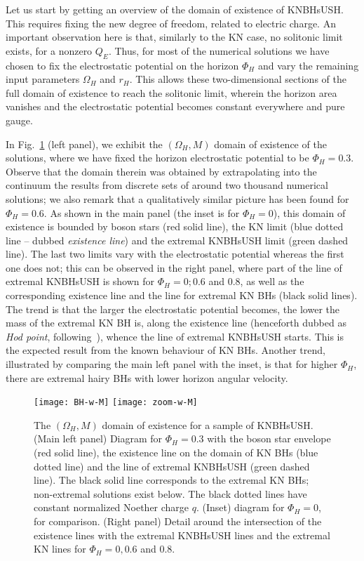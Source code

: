 Let us start by getting an overview of the domain of existence of KNBHsUSH. 
This requires fixing the new degree of freedom, related to electric charge. 
An important observation here is that, similarly to the
KN case, no solitonic limit exists, for a nonzero $Q_E$.
Thus, for most of the numerical solutions we have chosen to fix the electrostatic potential on the horizon $\Phi_H$
and vary the remaining  input parameters $\Omega_H$ and $r_H$.
This allows these  two-dimensional sections of the full domain of existence to reach the solitonic limit, 
wherein the horizon area vanishes and the electrostatic potential becomes constant everywhere and pure gauge.


 In Fig.~\ref{fig:w-M} (left panel), 
we exhibit the $(\Omega_H,M)$ domain of existence of the solutions, where we have fixed the horizon electrostatic potential to be $\Phi_H=0.3$. Observe that the domain therein was obtained by extrapolating into the continuum
the results from discrete sets of around two thousand numerical solutions; we also remark that a qualitatively similar picture has been found for $\Phi_H=0.6$.
 As shown in the main panel (the inset is for $\Phi_H=0$), 
this domain of existence is bounded by boson stars (red solid line), 
the KN limit (blue dotted line -- dubbed \textit{existence line}) 
and the extremal KNBHsUSH limit (green dashed line). 
The last two limits vary with the electrostatic potential whereas the first one does not; 
this can be observed in the right panel, where part of the line of extremal KNBHsUSH is shown for $\Phi_H=0; 0.6$ and $0.8$, as well as the corresponding existence line and the line for extremal KN BHs (black solid lines). 
The trend is that the larger the electrostatic potential becomes, the lower the mass of the extremal KN BH is, along the existence line (henceforth dubbed as \textit{Hod point}, following~\cite{Herdeiro:2015tia}), whence the line of extremal KNBHsUSH starts. This is the expected result from the known behaviour of KN BHs. Another trend, illustrated by comparing the main left panel with the inset, is that for higher $\Phi_H$, there are extremal hairy BHs with lower horizon angular velocity.

\begin{figure}[h!]
  \begin{center}
    \texttt{[image: BH-w-M]}
     \texttt{[image: zoom-w-M]}
  \end{center}
  \caption{The $(\Omega_H,M)$ domain of existence for a sample of KNBHsUSH. (Main left panel) Diagram for $\Phi_H=0.3$ with the boson star envelope (red solid line), the existence line on the domain of KN BHs (blue dotted line) and the line of extremal KNBHsUSH (green dashed line). The black solid line corresponds to the extremal KN BHs; non-extremal solutions exist below. The black dotted lines have constant normalized Noether charge $q$. (Inset) diagram for $\Phi_H=0$, for comparison. (Right panel) Detail around the intersection of the existence lines with the extremal KNBHsUSH lines and the extremal KN lines for $\Phi_H=0,0.6$ and $0.8$.  
	}
  \label{fig:w-M}
\end{figure}
 
